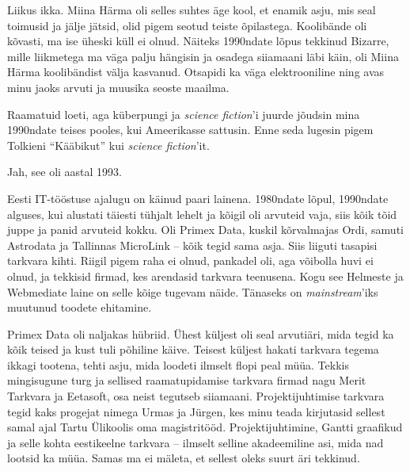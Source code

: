 
Liikus ikka. Miina Härma oli selles suhtes 
äge kool, et enamik asju, mis seal toimusid ja jälje jätsid, olid pigem 
seotud 
teiste õpilastega. Koolibände oli kõvasti, ma ise üheski küll ei olnud. 
Näiteks 1990ndate lõpus tekkinud Bizarre, mille liikmetega ma väga palju hängisin 
ja osadega 
siiamaani läbi käin, oli Miina Härma koolibändist välja kasvanud. Otsapidi ka väga elektrooniline ning avas minu jaoks arvuti 
ja muusika seoste maailma. 

Raamatuid loeti, aga küberpungi ja \emph{science fiction}'i 
juurde jõudsin mina 1990ndate teises pooles, kui Ameerikasse 
sattusin. Enne seda lugesin pigem Tolkieni \enquote{Kääbikut} kui 
\emph{science fiction}'it.


Jah, see oli aastal 1993.


Eesti IT-tööstuse ajalugu on käinud paari lainena. 
1980ndate lõpul, 1990ndate alguses, kui alustati 
täiesti tühjalt lehelt ja kõigil oli arvuteid vaja, siis kõik tõid juppe ja panid 
arvuteid kokku. Oli Primex Data, kuskil kõrvalmajas
Ordi, samuti Astrodata ja Tallinnas MicroLink -- kõik tegid sama asja. Siis liiguti 
tasapisi tarkvara kihti. Riigil pigem raha ei olnud, pankadel oli, aga 
võibolla huvi ei olnud, ja tekkisid firmad, kes arendasid tarkvara teenusena. Kogu 
see Helmeste ja Webmediate laine on selle kõige tugevam näide. 
Tänaseks on \emph{mainstream}'iks muutunud toodete ehitamine. 

Primex Data oli naljakas hübriid. Ühest küljest oli seal arvutiäri, 
mida tegid ka kõik teised ja kust tuli põhiline käive. Teisest 
küljest hakati tarkvara tegema ikkagi tootena, tehti asju, mida loodeti ilmselt flopi peal müüa. Tekkis mingisugune turg ja sellised raamatupidamise tarkvara firmad nagu
Merit Tarkvara ja 
Eetasoft, 
osa neist tegutseb siiamaani. Projektijuhtimise tarkvara tegid kaks 
progejat nimega Urmas ja Jürgen, kes minu teada kirjutasid sellest samal ajal Tartu 
Ülikoolis oma magistritööd. Projektijuhtimine, Gantti graafikud ja selle kohta 
eestikeelne tarkvara -- ilmselt selline akadeemiline asi, mida nad 
lootsid ka müüa. Samas ma ei mäleta, et sellest oleks suurt äri 
tekkinud. 

